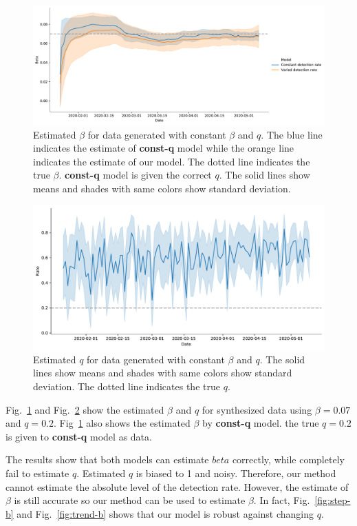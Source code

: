 \documentclass{amsart}
\begin{document}
\begin{figure}[h]
 \centering
 \includegraphics[width=\linewidth]{fig/const_beta.pdf}
 \caption{Estimated $\beta$ for data generated with constant $\beta$ and $q$. The blue line indicates the estimate of \textbf{const-q} model while the orange line indicates the estimate of our model. The dotted line indicates the true $\beta$. \textbf{const-q} model is given the correct $q$. The solid lines show means and shades with same colors show standard deviation.}
 \label{fig:const-b}
\end{figure}

\begin{figure}[h]
 \centering
 \includegraphics[width=\linewidth]{fig/const_q.pdf}
 \caption{Estimated $q$ for data generated with constant $\beta$ and $q$. The solid lines show means and shades with same colors show standard deviation. The dotted line indicates the true $q$. }
 \label{fig:const-q}
\end{figure}

Fig.~\ref{fig:const-b} and Fig.~\ref{fig:const-q} show the estimated $\beta$ and $q$ for synthesized data using $\beta=0.07$ and $q = 0.2$.
Fig~\ref{fig:const-b} also shows the estimated $\beta$ by \textbf{const-q} model.
the true $q = 0.2$ is given to \textbf{const-q} model as data.

The results show that both models can estimate $beta$ correctly, while completely fail to estimate $q$.
Estimated $q$ is biased to 1 and noisy.
Therefore, our method cannot estimate the absolute level of the detection rate.
However, the estimate of $\beta$ is still accurate so our method can be used to estimate $\beta$.
In fact, Fig.~\ref{fig:step-b} and Fig.~\ref{fig:trend-b} shows that our model is robust against changing $q$.
\end{document}
